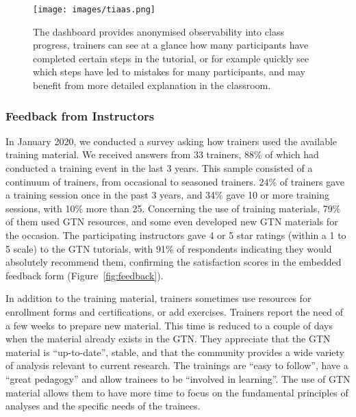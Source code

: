 \documentclass[10pt,letterpaper]{article}
\begin{document}
\begin{figure}[!ht]
	\centering
	\texttt{[image: images/tiaas.png]}
	\caption{The dashboard provides anonymised observability into class progress, trainers can see at a glance how many participants have completed certain steps in the tutorial, or for example quickly see which steps have led to mistakes for many participants, and may benefit from more detailed explanation in the classroom. \label{fig:tiaas-dashboard}}
\end{figure}




\subsubsection*{Feedback from Instructors}

In January 2020, we conducted a survey asking how trainers used the available training material. We received answers from 33 trainers, 88\% of which had conducted a training event in the last 3 years.
This sample consisted of a continuum of trainers, from occasional to seasoned trainers. 24\% of trainers gave a training session once in the past 3 years, and 34\% gave 10 or more training sessions, with 10\% more than 25.
Concerning the use of training materials, 79\% of them used GTN resources, and some even developed new GTN materials for the occasion. 
The participating instructors gave 4 or 5 star ratings (within a 1 to 5 scale) to the GTN tutorials, with 91\% of respondents indicating they would absolutely recommend them, confirming the satisfaction scores in the embedded feedback form (Figure~\ref{fig:feedback}).

In addition to the training material, trainers sometimes use resources for enrollment forms and certifications, or add exercises.
Trainers report the need of a few weeks to prepare new material.
This time is reduced to a couple of days when the material already exists in the GTN.
They appreciate that the GTN material is “up-to-date”, stable, and that the community provides a wide variety of analysis relevant to current research.
The trainings are “easy to follow”, have a “great pedagogy” and allow trainees to be “involved in learning”.
The use of GTN material allows them to have more time to focus on the fundamental principles of  analyses and the specific needs of the trainees.
\end{document}
